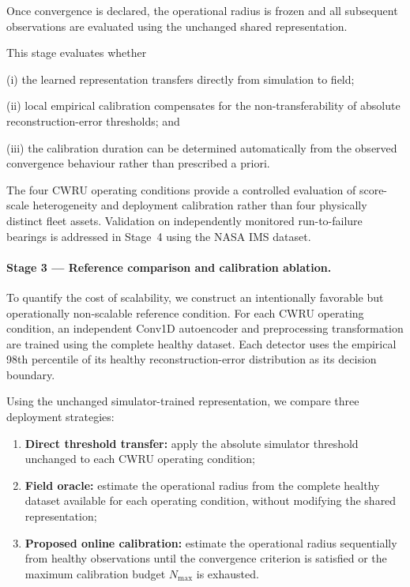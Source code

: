 \documentclass{trbunofficial}
\begin{document}
Once convergence is declared, the operational radius is frozen and all
subsequent observations are evaluated using the unchanged shared
representation.

This stage evaluates whether

(i) the learned representation transfers directly from simulation to field;

(ii) local empirical calibration compensates for the non-transferability of
absolute reconstruction-error thresholds; and

(iii) the calibration duration can be determined automatically from the
observed convergence behaviour rather than prescribed a priori.

The four CWRU operating conditions provide a controlled evaluation of
score-scale heterogeneity and deployment calibration rather than four
physically distinct fleet assets.
Validation on independently monitored run-to-failure bearings is addressed in
Stage~4 using the NASA IMS dataset.

\paragraph{Stage 3 --- Reference comparison and calibration ablation.}

To quantify the cost of scalability, we construct an intentionally favorable
but operationally non-scalable reference condition. For each CWRU operating
condition, an independent Conv1D autoencoder and preprocessing transformation
are trained using the complete healthy dataset. Each detector uses the
empirical 98th percentile of its healthy reconstruction-error distribution
as its decision boundary.

Using the unchanged simulator-trained representation, we compare three
deployment strategies:

\begin{enumerate}[leftmargin=1.5em]

\item \textbf{Direct threshold transfer:}
apply the absolute simulator threshold unchanged to each CWRU operating
condition;

\item \textbf{Field oracle:}
estimate the operational radius from the complete healthy dataset available
for each operating condition, without modifying the shared representation;

\item \textbf{Proposed online calibration:}
estimate the operational radius sequentially from healthy observations until
the convergence criterion is satisfied or the maximum calibration budget
$N_{\max}$ is exhausted.

\end{enumerate}
\end{document}
